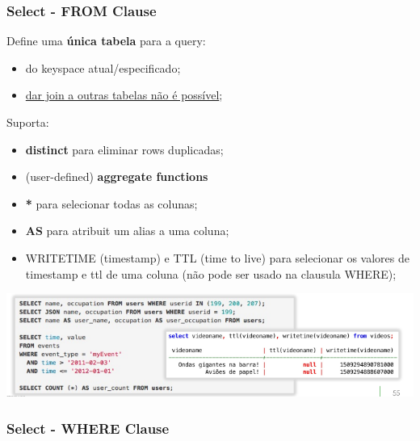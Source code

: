 \documentclass{article}
\begin{document}
\subsubsection{Select - FROM Clause}

\begin{flushleft}
  Define uma \textbf{única tabela} para a query:
  \begin{itemize}
    \item do keyspace atual/especificado;
    \item \uline{dar join a outras tabelas não é possível};
  \end{itemize}

  \pagebreak

  Suporta:
  \begin{itemize}
    \item \textbf{distinct} para eliminar rows duplicadas;
    \item (user-defined) \textbf{aggregate functions}
    \item \textbf{*} para selecionar todas as colunas;
    \item \textbf{AS} para atribuit um alias a uma coluna;
    \item WRITETIME (timestamp) e TTL (time to live) para selecionar os valores
    de timestamp e ttl de uma coluna (não pode ser usado na clausula WHERE);
  \end{itemize}

  \begin{center}
    \includegraphics[scale=0.3]{28}
  \end{center}
\end{flushleft}

\subsubsection{Select - WHERE Clause}
\end{document}
